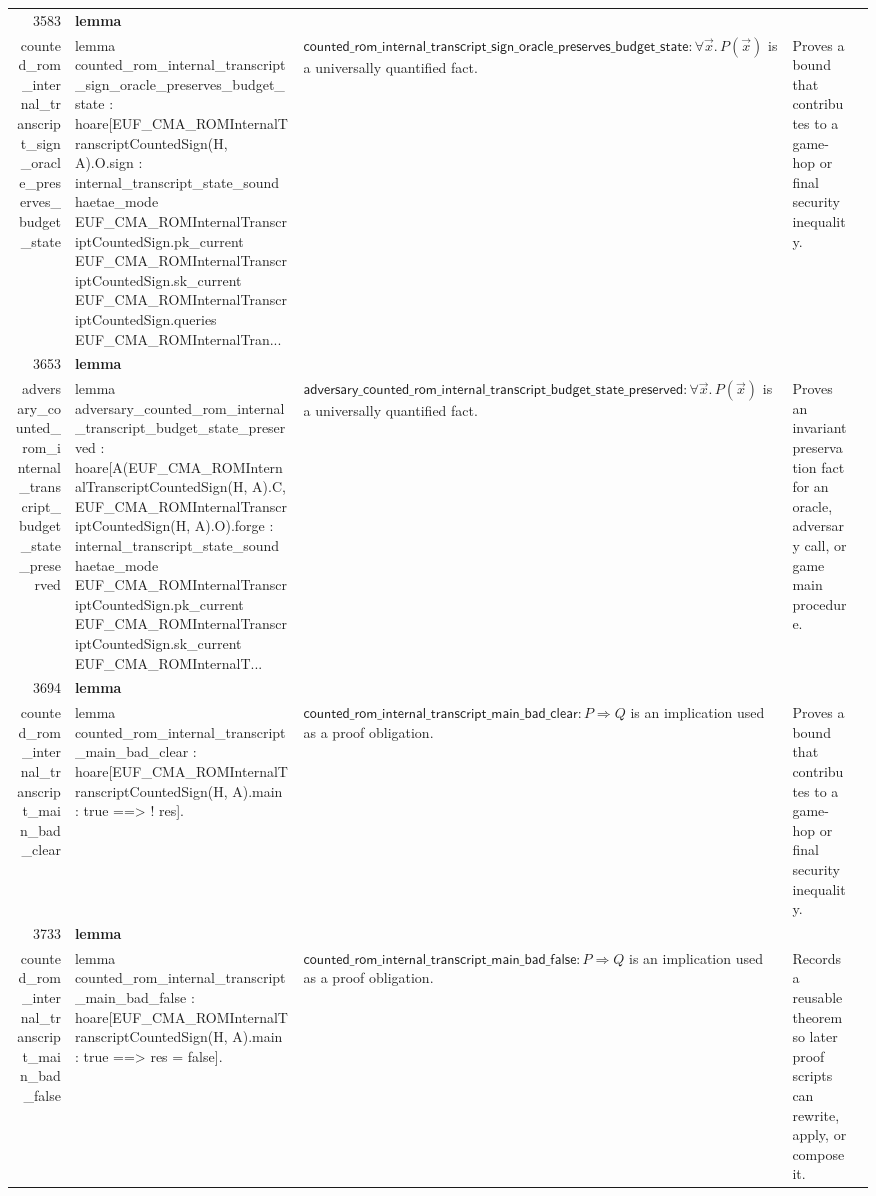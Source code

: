 \documentclass[10pt]{article}
\newcommand{\ec}[1]{\begingroup\ttfamily\scriptsize #1\endgroup}
\begin{document}
\begin{longtable}{r L{0.17\textwidth} L{0.26\textwidth} L{0.27\textwidth} L{0.20\textwidth}}
3583 & \textbf{lemma}\\\ec{counted\_rom\_internal\_transcript\_sign\_oracle\_preserves\_budget\_state} & \ec{lemma counted\_rom\_internal\_transcript\_sign\_oracle\_preserves\_budget\_state : hoare[EUF\_CMA\_ROMInternalTranscriptCountedSign(H, A).O.sign : internal\_transcript\_state\_sound haetae\_mode EUF\_CMA\_ROMInternalTranscriptCountedSign.pk\_current EUF\_CMA\_ROMInternalTranscriptCountedSign.sk\_current EUF\_CMA\_ROMInternalTranscriptCountedSign.queries EUF\_CMA\_ROMInternalTran...} & \(\mathsf{counted\_rom\_internal\_transcript\_sign\_oracle\_preserves\_budget\_state} : \forall \vec{x}.\, P(\vec{x})\) is a universally quantified fact. & Proves a bound that contributes to a game-hop or final security inequality. \\
3653 & \textbf{lemma}\\\ec{adversary\_counted\_rom\_internal\_transcript\_budget\_state\_preserved} & \ec{lemma adversary\_counted\_rom\_internal\_transcript\_budget\_state\_preserved : hoare[A(EUF\_CMA\_ROMInternalTranscriptCountedSign(H, A).C, EUF\_CMA\_ROMInternalTranscriptCountedSign(H, A).O).forge : internal\_transcript\_state\_sound haetae\_mode EUF\_CMA\_ROMInternalTranscriptCountedSign.pk\_current EUF\_CMA\_ROMInternalTranscriptCountedSign.sk\_current EUF\_CMA\_ROMInternalT...} & \(\mathsf{adversary\_counted\_rom\_internal\_transcript\_budget\_state\_preserved} : \forall \vec{x}.\, P(\vec{x})\) is a universally quantified fact. & Proves an invariant preservation fact for an oracle, adversary call, or game main procedure. \\
3694 & \textbf{lemma}\\\ec{counted\_rom\_internal\_transcript\_main\_bad\_clear} & \ec{lemma counted\_rom\_internal\_transcript\_main\_bad\_clear : hoare[EUF\_CMA\_ROMInternalTranscriptCountedSign(H, A).main : true ==> ! res].} & \(\mathsf{counted\_rom\_internal\_transcript\_main\_bad\_clear} : P \Rightarrow Q\) is an implication used as a proof obligation. & Proves a bound that contributes to a game-hop or final security inequality. \\
3733 & \textbf{lemma}\\\ec{counted\_rom\_internal\_transcript\_main\_bad\_false} & \ec{lemma counted\_rom\_internal\_transcript\_main\_bad\_false : hoare[EUF\_CMA\_ROMInternalTranscriptCountedSign(H, A).main : true ==> res = false].} & \(\mathsf{counted\_rom\_internal\_transcript\_main\_bad\_false} : P \Rightarrow Q\) is an implication used as a proof obligation. & Records a reusable theorem so later proof scripts can rewrite, apply, or compose it. \\

\end{longtable}
\end{document}
